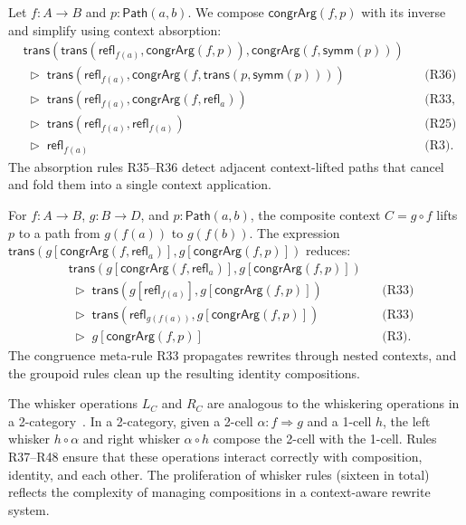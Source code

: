 \documentclass[manuscript]{BSLstyle}
\newcommand{\Path}{\mathsf{Path}}
\newcommand{\refl}{\mathsf{refl}}
\newcommand{\symm}{\mathsf{symm}}
\newcommand{\trans}{\mathsf{trans}}
\newcommand{\congrArg}{\mathsf{congrArg}}
\begin{document}
\begin{example}\label{ex:congruence-prop}
Let $f : A \to B$ and $p : \Path(a, b)$.  We compose $\congrArg(f, p)$
with its inverse and simplify using context absorption:
\begin{align*}
&\trans(\trans(\refl_{f(a)}, \congrArg(f, p)), \congrArg(f, \symm(p))) \\
  &\;\triangleright\; \trans(\refl_{f(a)}, \congrArg(f, \trans(p, \symm(p))))
  && \text{(R36)} \\
  &\;\triangleright\; \trans(\refl_{f(a)}, \congrArg(f, \refl_a))
  && \text{(R33, R5)} \\
  &\;\triangleright\; \trans(\refl_{f(a)}, \refl_{f(a)})
  && \text{(R25)} \\
  &\;\triangleright\; \refl_{f(a)}
  && \text{(R3).}
\end{align*}
The absorption rules R35--R36 detect adjacent context-lifted paths that
cancel and fold them into a single context application.
\end{example}

\begin{example}\label{ex:nested-context}
For $f : A \to B$, $g : B \to D$, and $p : \Path(a, b)$, the
composite context $C = g \circ f$ lifts $p$ to a path from
$g(f(a))$ to $g(f(b))$.  The expression
$\trans(g[\congrArg(f, \refl_a)], g[\congrArg(f, p)])$ reduces:
\begin{align*}
&\trans(g[\congrArg(f, \refl_a)], g[\congrArg(f, p)]) \\
&\;\triangleright\; \trans(g[\refl_{f(a)}], g[\congrArg(f, p)])
  && \text{(R33)} \\
&\;\triangleright\; \trans(\refl_{g(f(a))}, g[\congrArg(f, p)])
  && \text{(R33)} \\
&\;\triangleright\; g[\congrArg(f, p)]
  && \text{(R3).}
\end{align*}
The congruence meta-rule R33 propagates rewrites through nested contexts,
and the groupoid rules clean up the resulting identity compositions.
\end{example}

\begin{remark}
The whisker operations $L_C$ and $R_C$ are analogous to the
whiskering operations in a 2-category~\cite{Benabou67}.  In a 2-category,
given a 2-cell $\alpha : f \Rightarrow g$ and a 1-cell $h$, the left
whisker $h \circ \alpha$ and right whisker $\alpha \circ h$ compose the
2-cell with the 1-cell.  Rules R37--R48 ensure that these operations
interact correctly with composition, identity, and each other.
The proliferation of whisker rules (sixteen in total) reflects the
complexity of managing compositions in a context-aware rewrite system.
\end{remark}
\end{document}
